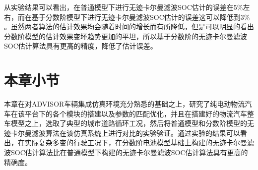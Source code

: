 从实验结果可以看出，在普通模型下进行无迹卡尔曼滤波SOC估计的误差在5$\% $左右，而在基于分数阶模型下进行无迹卡尔曼滤波SOC估计的误差这可以降低到3$\% $。虽然两者算法的估计效果均会随着时间的增长而有所降低，但是可以明显的看出分数阶模型的估计效果变坏趋势更加的平坦，所以基于分数阶的无迹卡尔曼滤波SOC估计算法具有更高的精度，降低了估计误差。

\FloatBarrier

\section{本章小节}
本章在对ADVISOR车辆集成仿真环境充分熟悉的基础之上，研究了纯电动物流汽车在该平台下的各个模块的搭建以及参数的匹配优化，并且在搭建好的物流汽车整车模型之上，选取了典型的城市道路循环工况，然后将普通模型和分数阶模型的无迹卡尔曼滤波算法在该仿真系统上进行对比的实验验证。通过实验的结果可以看出，在实际复杂多变的行驶工况下，在分数阶电池模型基础上构建的无迹卡尔曼滤波SOC估计算法比在普通模型下构建的无迹卡尔曼滤波SOC估计算法具有更高的精确度。